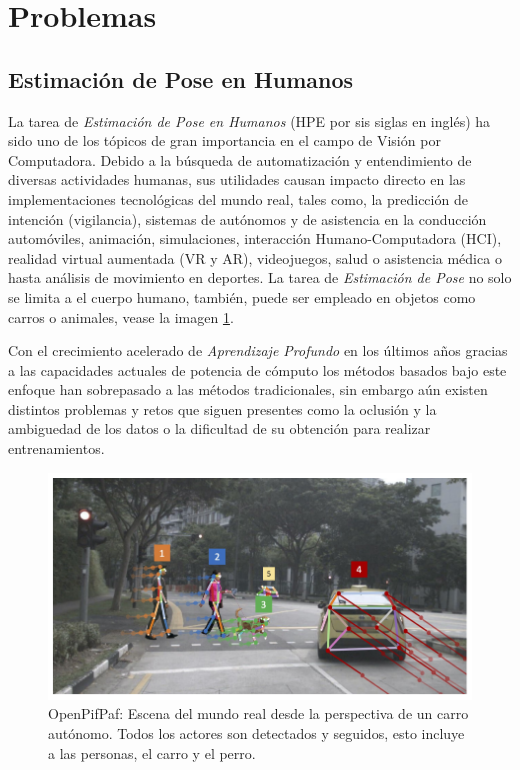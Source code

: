 \section{Problemas}

\subsection{Estimación de Pose en Humanos}

La tarea de \textit{Estimación de Pose en Humanos} (HPE por sis siglas en inglés) ha sido uno de los
tópicos de gran importancia en
el campo de Visión por Computadora. Debido a la búsqueda de automatización y entendimiento de
diversas actividades humanas, sus utilidades causan impacto directo en las implementaciones
tecnológicas del mundo real, tales como, la predicción de intención (vigilancia), sistemas de
autónomos y de asistencia en la conducción automóviles, animación, simulaciones,
interacción Humano-Computadora (HCI), realidad virtual
aumentada (VR y AR), videojuegos, salud o asistencia médica o hasta análisis de movimiento en
deportes. La tarea de \textit{Estimación de Pose} no solo se limita a el cuerpo
humano, también, puede ser empleado en objetos como carros o animales, vease la imagen \ref{fig:PE-track}.

Con el crecimiento acelerado de \textit{Aprendizaje Profundo} en los últimos años gracias a las
capacidades actuales de potencia de cómputo los métodos basados bajo este enfoque han sobrepasado
a las métodos tradicionales, sin embargo aún existen distintos problemas y retos que siguen presentes
como la oclusión y la ambiguedad de los datos o la dificultad de su obtención para realizar
entrenamientos.

\begin{figure}[ht!]
    \centering
    \includegraphics[width=0.4 \textwidth]{Chapters/1. Pose Estimation/figures/openpifpaf.png}
    \caption{OpenPifPaf: Escena del mundo real desde la perspectiva de un carro autónomo. Todos los actores
             son detectados y seguidos, esto incluye a las personas, el carro y el perro. \cite{DBLP:journals/corr/abs-2103-02440}}
    \label{fig:PE-track}
\end{figure}


